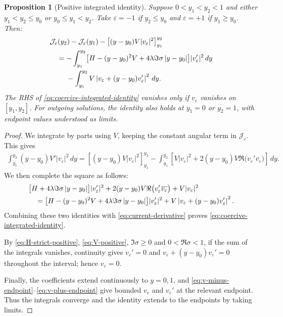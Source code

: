 \documentclass[11pt]{article}
\numberwithin{equation}{section}
\newtheorem{proposition}[theorem]{Proposition}
\begin{document}
	\begin{proposition}[Positive integrated identity]
		\label{prop:coercive-integrated-identity}
		Suppose $0<y_1<y_2<1$ and either $y_1 < y_2 \le y_0$ or $y_0 \le y_1 < y_2$.
		{Take $\varepsilon=-1$ if $y_2\le y_0$ and $\varepsilon=+1$ if $y_1\ge y_0$. Then:}
		\begin{align}
			&\mathcal J_\varepsilon(y_2)-\mathcal J_\varepsilon(y_1)
			-\left[(y-y_0)V|v_\varepsilon|^2\right]_{y_1}^{y_2}
			\notag\\
			&\quad=-\int_{y_1}^{y_2}
			\bigl[H-(y-y_0)^2V+4\lambda\Im\sigma\,|y-y_0|\bigr]
			|v_\varepsilon'|^2\,dy\notag\\
			&\qquad\ -\int_{y_1}^{y_2}
			V\left|v_\varepsilon+(y-y_0)v_\varepsilon'\right|^2\,dy.
			\label{eq:coercive-integrated-identity}
		\end{align}
		The RHS of \eqref{eq:coercive-integrated-identity} vanishes only if $v_\varepsilon$ vanishes on $[y_1,y_2]$.
		For outgoing solutions, the identity also holds at $y_1=0$ or
		$y_2=1$, with endpoint values understood as limits.
	\end{proposition}
	
	\begin{proof}
		We integrate by parts using $V$, keeping the constant angular
		term in $\mathcal J_\varepsilon$. This gives
		\begin{align}
			\int_{y_1}^{y_2}(y-y_0)V'|v_\varepsilon|^2\,dy
			={}\left[(y-y_0)V|v_\varepsilon|^2\right]_{y_1}^{y_2}
			-\int_{y_1}^{y_2}
			\left[V|v_\varepsilon|^2
			+2(y-y_0)V\Re\bigl(v_\varepsilon'
			\overline{v_\varepsilon}\bigr)\right]\,dy.
			\label{eq:V-integration-by-parts}
		\end{align}
		We then complete the square as follows:
		\begin{align}
			&\bigl[H+4\lambda\Im\sigma\,|y-y_0|\bigr]|v_\varepsilon'|^2
			+2(y-y_0)V\Re\bigl(v_\varepsilon'
			\overline{v_\varepsilon}\bigr)
			+V|v_\varepsilon|^2\notag\\
			&\quad=
			\bigl[H-(y-y_0)^2V+4\lambda\Im\sigma\,|y-y_0|\bigr]
			|v_\varepsilon'|^2
			+V\left|v_\varepsilon+(y-y_0)v_\varepsilon'\right|^2.
			\label{eq:complete-square}
		\end{align}
		Combining these two identities with \eqref{eq:current-derivative}
		proves \eqref{eq:coercive-integrated-identity}.
		
		By \eqref{eq:H-strict-positive}, \eqref{eq:V-positive}, 
		$\Im\sigma\geq0$ and $0< \Re \sigma <1$, if the sum of the
		integrals vanishes, continuity gives $v_\varepsilon'=0$ and
		$v_\varepsilon+(y-y_0)v_\varepsilon'=0$ throughout the interval;
		hence $v_\varepsilon=0$.
		
		Finally, the coefficients extend continuously to $y=0,1$, and
		\eqref{eq:v-minus-endpoint}--\eqref{eq:v-plus-endpoint} give bounded
		$v_\varepsilon$ and $v_\varepsilon'$ at the relevant endpoint.
		Thus the integrals converge and the identity extends to the
		endpoints by taking limits.
	\end{proof}
	
\end{document}
